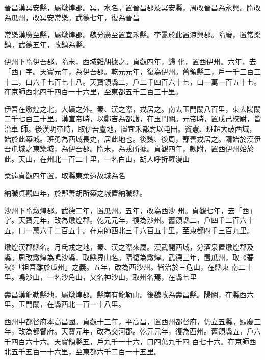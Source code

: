 \begin{pinyinscope}
 晉昌漢冥安縣，屬燉煌郡。冥，水名。置晉昌郡及冥安縣，周改晉昌為永興。隋改為瓜州，改冥安常樂。武德七年，復為晉昌



 常樂漢廣至縣，屬燉煌郡。魏分廣至置宜禾縣。李暠於此置涼興郡。隋廢，置常樂鎮。武德五年，改鎮為縣。



 伊州下隋伊吾郡。隋末，西域雜胡據之。貞觀四年，歸
 化，置西伊州。六年，去「西」字。天寶元年，為伊吾郡。乾元元年，復為伊州。舊領縣三，戶一千三百三十二，口六千七百七十八。天寶領縣二，戶二千四百六十七，口一萬一百五十七。在京師西北四千四百一十六里，至東都五千三百三十里。



 伊吾在燉煌之北，大磧之外。秦、漢之際，戎居之。南去玉門關八百里，東去陽關二千七百三十里。漢宣帝時，以鄭吉為都護，在玉門關。元帝時，置戊己校尉，皆治車
 師。後漢明帝時，取伊吾盧地，置宜禾都尉以屯田。竇憲、班超大破西域，始於此築城。班勇為西域長史，居此地也。後魏、後周，鄯善戎居之。隋始於漢伊吾屯城之東築城，為伊吾郡。隋末，為戎所據。貞觀四年，款附，置西伊州始於此。天山，在州北一百二十里，一名白山，胡人呼折羅漫山



 柔遠貞觀四年置，取縣東柔遠故城為名



 納職貞觀四年，於鄯善胡所築之城置納職縣。



 沙州下隋燉煌郡。武德二年，置瓜州。五年，改為西沙
 州。貞觀七年，去「西」字。天寶元年，改為燉煌郡。乾元元年，復為沙州。舊領縣二，戶四千二百六十五，口一萬六千二百五十。在京師西北三千六百五十里，至東都四千三百九里。



 燉煌漢郡縣名。月氐戎之地，秦、漢之際來屬。漢武開西域，分酒泉置燉煌郡及縣。周改燉煌為鳴沙縣，取縣界山名。隋復為燉煌。武德三年，置瓜州，取《春秋》「祖吾離於瓜州」之義。五年，改為西沙州。皆治於三危山，在縣東
 南二十里。鳴沙山，一名沙角山，又名神沙山，取州名焉，在縣七里



 壽昌漢龍勒縣地，屬燉煌郡。縣南有龍勒山。後魏改為壽昌縣。陽關，在縣西六里。玉門關，在縣西北一百一十八里。



 西州中都督府本高昌國。貞觀十三年，平高昌，置西州都督府，仍立五縣。顯慶三年，改為都督府。天寶元年，改為交河郡。乾元元年，復為西州。舊領縣五，戶六千四百六十六。天寶領縣五，戶九千一十六，口四萬九千四
 百七十六。在京師西北五千五百一十六里，至東都六千二百一十五里。




\end{pinyinscope}
